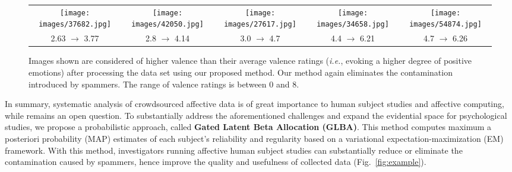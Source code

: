 \documentclass[10pt,journal,letterpaper,compsoc,twoside]{IEEEtran}
\begin{document}
\begin{figure*}
\centering
\begin{tabular}{ccccc}
\texttt{[image: images/37682.jpg]} &
\texttt{[image: images/42050.jpg]} &
\texttt{[image: images/27617.jpg]} &
\texttt{[image: images/34658.jpg]} &
\texttt{[image: images/54874.jpg]}\\[-0.2cm]
2.63 $\rightarrow$ 3.77 &
2.8 $\rightarrow$ 4.14 &
3.0 $\rightarrow$ 4.7 &
4.4 $\rightarrow$ 6.21 &
4.7 $\rightarrow$ 6.26
\end{tabular}
\caption{Images shown are considered of higher valence 
than their average valence ratings ({\it i.e.}, evoking a higher degree of
positive emotions) 
after processing the data set using our proposed method. 
Our method again eliminates the contamination introduced by spammers. The range of valence ratings is between 0 and 8.}\label{fig:example2}
\end{figure*}

In summary, systematic analysis of crowdsourced 
affective data is of great importance to human subject studies 
and affective computing, while remains an open question.
To substantially address the aforementioned challenges and expand
the evidential space for psychological studies, 
we propose a probabilistic approach, called {\bf Gated
Latent Beta Allocation (GLBA)}. This method computes maximum a posteriori probability (MAP) estimates of 
each subject's reliability and regularity based on a variational expectation-maximization (EM) framework. 
With this method, investigators running affective human subject studies can substantially reduce or eliminate
the contamination caused by spammers, hence improve the quality and usefulness of collected data (Fig.~\ref{fig:example}).
\end{document}
